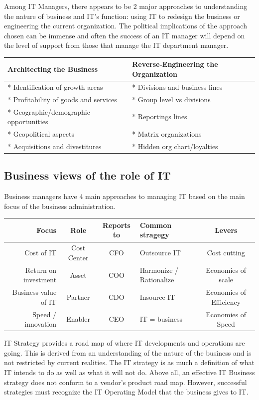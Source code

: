 \documentclass[]{book}
\begin{document}
Among IT Managers, there appears to be 2 major approaches to understanding the nature of business and IT's function: using IT to redesign the business or engineering the current organization. The political implications of the approach chosen can be immense and often the success of an IT manager will depend on the level of support from those that manage the IT department manager.

\begin{longtable}[]{@{}ll@{}}
\toprule
Architecting the Business & Reverse-Engineering the Organization\tabularnewline
\midrule
\endhead
* Identification of growth areas & * Divisions and business lines\tabularnewline
* Profitability of goods and services & * Group level vs divisions\tabularnewline
* Geographic/demographic opportunities & * Reportings lines\tabularnewline
* Geopolitical aspects & * Matrix organizations\tabularnewline
* Acquisitions and divestitures & * Hidden org chart/loyalties\tabularnewline
\bottomrule
\end{longtable}

\hypertarget{business-views-of-the-role-of-it}{%
\subsection{Business views of the role of IT}\label{business-views-of-the-role-of-it}}

Business managers have 4 main approaches to managing IT based on the main focus of the business administration.

\begin{longtable}[]{@{}rcclc@{}}
\toprule
\textbf{Focus} & \textbf{Role} & \textbf{Reports to} & \textbf{Common stragegy} & \textbf{Levers}\tabularnewline
\midrule
\endhead
Cost of IT & Cost Center & CFO & Outsource IT & Cost cutting\tabularnewline
Return on investment & Asset & COO & Harmonize / Rationalize & Economies of scale\tabularnewline
Business value of IT & Partner & CDO & Insource IT & Economies of Efficiency\tabularnewline
Speed / innovation & Enabler & CEO & IT = business & Economies of Speed\tabularnewline
\bottomrule
\end{longtable}

IT Strategy provides a road map of where IT developments and operations are going. This is derived from an understanding of the nature of the business and is not restricted by current realities. The IT strategy is as much a definition of what IT intends to do as well as what it will not do. Above all, an effective IT Business strategy does not conform to a vendor's product road map. However, successful strategies must recognize the IT Operating Model that the business gives to IT. \citep{Ross2006}
\end{document}
